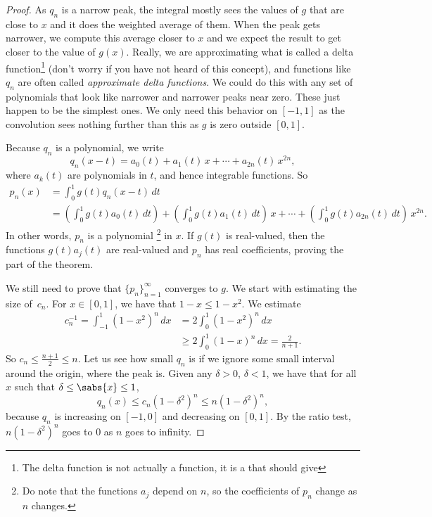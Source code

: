 \begin{proof}
As $q_n$ is a narrow peak, the integral
mostly sees the values of $g$ that are
close to $x$ and it does the weighted average of them.
When the peak gets narrower, we compute this average closer to $x$
and we expect the result to get closer to the value of $g(x)$.  Really, we are
approximating what is called a delta function\footnote{The delta function
is not actually a function,
it is a  that should give
}
(don't worry if you have not
heard of this concept),
and functions like $q_n$ are often called
\emph{approximate delta functions}.
We could do this with any set of polynomials that look like narrower
and narrower peaks near zero.  These just happen to be the simplest ones.
We only need this behavior on $[-1,1]$ as the convolution sees nothing
further than this as $g$ is zero outside $[0,1]$.

Because $q_n$ is a polynomial, we write
\begin{equation*}
q_n(x-t) = a_0(t) + a_1(t)\,x + \cdots + a_{2n}(t)\, x^{2n} ,
\end{equation*}
where $a_k(t)$ are polynomials in $t$, and hence
integrable functions.
So
\begin{equation*}
\begin{split}
p_n(x) & =
\int_{0}^1 g(t)q_n(x-t) \,dt
\\
&=
\left(
\int_0^1
g(t)
a_0(t)\,dt
\right)
+
\left(
\int_0^1
g(t)
a_1(t)\,dt
\right)
\,
x
+
\cdots
+
\left(
\int_0^1
g(t)
a_{2n}(t)\,dt
\right)
\,
x^{2n} .
\end{split}
\end{equation*}
In other words, $p_n$ is a polynomial%
\footnote{%
Do note that the functions $a_j$ depend on $n$, so the coefficients of $p_n$
change as $n$ changes.}
 in $x$.
If $g(t)$ is real-valued, then the functions $g(t)a_j(t)$ are
real-valued and $p_n$ has real coefficients,
proving the  part of the theorem.

We still need to prove that $\{ p_n \}_{n=1}^\infty$ converges to $g$.
We start with estimating the size of~$c_n$.
For $x \in [0,1]$, we have that $1-x \leq 1-x^2$.  We estimate
\begin{equation*}
\begin{split}
c_n^{-1}   = \int_{-1}^1 {(1-x^2)}^n \, dx
& = 2\int_0^1 {(1-x^2)}^n \, dx \\
& \geq 2\int_0^{1} {(1-x)}^n \, dx
= \frac{2}{n+1} .
\end{split}
\end{equation*}
So $c_n \leq \frac{n+1}{2} \leq n$.
Let us see how small $q_n$ is if we ignore some small interval around the origin,
where the peak is.
Given any $\delta > 0$, $\delta < 1$,
we have that for all
$x$ such that $\delta \leq \sabs{x} \leq 1$,
\begin{equation*}
q_n(x) \leq c_n {(1-\delta^2)}^n \leq  n{(1-\delta^2)}^n ,
\end{equation*}
because $q_n$ is increasing on $[-1,0]$ and decreasing on $[0,1]$.
By the ratio test, 
$n{(1-\delta^2)}^n$ goes to 0 as $n$ goes to infinity.


\end{proof}
